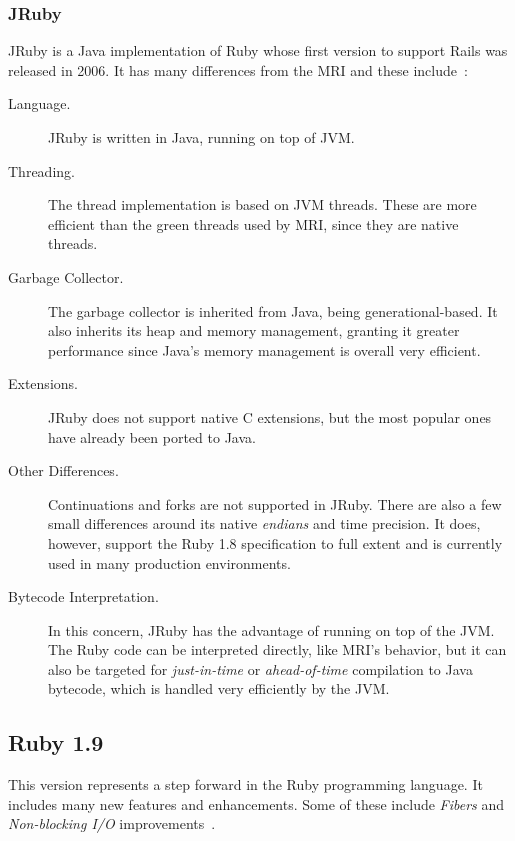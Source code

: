 \subsubsection{JRuby}
JRuby is a Java implementation of Ruby whose first version to support Rails was released in 2006. It has many differences from the MRI and these include~\cite{mri_jruby_comparison, jruby_performance_glassfish}:
\begin{description}
\item[Language.] JRuby is written in Java, running on top of JVM.
\item[Threading.] The thread implementation is based on JVM threads. These are more efficient than the green threads used by MRI, since they are native threads.
\item[Garbage Collector.]  The garbage collector is inherited from Java, being generational-based. It also inherits its heap and memory management, granting it greater performance since Java's memory management is overall very efficient.
\item[Extensions.]  JRuby does not support native C extensions, but the most popular ones have already been ported to Java.
\item[Other Differences.] Continuations and forks are not supported in JRuby. There are also a few small differences around its native \textit{endians} and time precision. It does, however, support the Ruby 1.8 specification to full extent and is currently used in many production environments.
\item[Bytecode Interpretation.] In this concern, JRuby has the advantage of running on top of the JVM. The Ruby code can be interpreted directly, like MRI's behavior, but it can also be targeted for \textit{just-in-time} or \textit{ahead-of-time} compilation to Java bytecode, which is handled very efficiently by the JVM.
\end{description}


\subsection{Ruby 1.9}
This version represents a step forward in the Ruby programming language. It includes many new features and enhancements. Some of these include \textit{Fibers} and \textit{Non-blocking I/O} improvements~\cite{changes_ruby19}.


